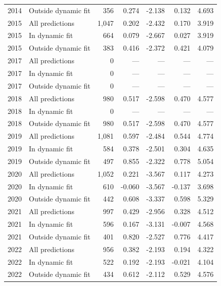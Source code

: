 \begin{longtable}{llrrrrr}
2014 & Outside dynamic fit & 356 & 0.274 & -2.138 & 0.132 & 4.693 \\
2015 & All predictions & 1,047 & 0.202 & -2.432 & 0.170 & 3.919 \\
2015 & In dynamic fit & 664 & 0.079 & -2.667 & 0.027 & 3.919 \\
2015 & Outside dynamic fit & 383 & 0.416 & -2.372 & 0.421 & 4.079 \\
2017 & All predictions & 0 & --- & --- & --- & --- \\
2017 & In dynamic fit & 0 & --- & --- & --- & --- \\
2017 & Outside dynamic fit & 0 & --- & --- & --- & --- \\
2018 & All predictions & 980 & 0.517 & -2.598 & 0.470 & 4.577 \\
2018 & In dynamic fit & 0 & --- & --- & --- & --- \\
2018 & Outside dynamic fit & 980 & 0.517 & -2.598 & 0.470 & 4.577 \\
2019 & All predictions & 1,081 & 0.597 & -2.484 & 0.544 & 4.774 \\
2019 & In dynamic fit & 584 & 0.378 & -2.501 & 0.304 & 4.635 \\
2019 & Outside dynamic fit & 497 & 0.855 & -2.322 & 0.778 & 5.054 \\
2020 & All predictions & 1,052 & 0.221 & -3.567 & 0.117 & 4.273 \\
2020 & In dynamic fit & 610 & -0.060 & -3.567 & -0.137 & 3.698 \\
2020 & Outside dynamic fit & 442 & 0.608 & -3.337 & 0.598 & 5.329 \\
2021 & All predictions & 997 & 0.429 & -2.956 & 0.328 & 4.512 \\
2021 & In dynamic fit & 596 & 0.167 & -3.131 & -0.007 & 4.568 \\
2021 & Outside dynamic fit & 401 & 0.820 & -2.527 & 0.776 & 4.417 \\
2022 & All predictions & 956 & 0.382 & -2.193 & 0.194 & 4.322 \\
2022 & In dynamic fit & 522 & 0.192 & -2.193 & -0.021 & 4.104 \\
2022 & Outside dynamic fit & 434 & 0.612 & -2.112 & 0.529 & 4.576 \\
\end{longtable}
\endgroup
{}
